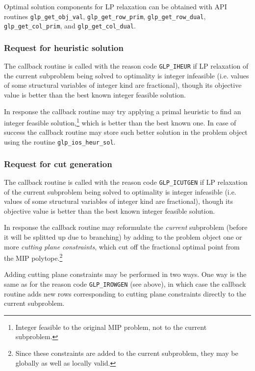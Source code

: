Optimal solution components for LP relaxation can be obtained with API
routines \verb|glp_get_obj_val|, \verb|glp_get_row_prim|,
\verb|glp_get_row_dual|, \verb|glp_get_col_prim|, and
\verb|glp_get_col_dual|.

\subsubsection*{Request for heuristic solution}

The callback routine is called with the reason code \verb|GLP_IHEUR|
if LP relaxation of the current subproblem being solved to optimality
is integer infeasible (i.e. values of some structural variables of
integer kind are fractional), though its objective value is better than
the best known integer feasible solution.

In response the callback routine may try applying a primal heuristic
to find an integer feasible solution,\footnote{Integer feasible to the
original MIP problem, not to the current subproblem.} which is better
than the best known one. In case of success the callback routine may
store such better solution in the problem object using the routine
\verb|glp_ios_heur_sol|.

\subsubsection*{Request for cut generation}

The callback routine is called with the reason code \verb|GLP_ICUTGEN|
if LP relaxation of the current subproblem being solved to optimality
is integer infeasible (i.e. values of some structural variables of
integer kind are fractional), though its objective value is better than
the best known integer feasible solution.

In response the callback routine may reformulate the {\it current}
subproblem (before it will be splitted up due to branching) by adding to
the problem object one or more {\it cutting plane constraints}, which
cut off the fractional optimal point from the MIP
polytope.\footnote{Since these constraints are added to the current
subproblem, they may be globally as well as locally valid.}

Adding cutting plane constraints may be performed in two ways.
One way is the same as for the reason code \verb|GLP_IROWGEN| (see
above), in which case the callback routine adds new rows corresponding
to cutting plane constraints directly to the current subproblem.

